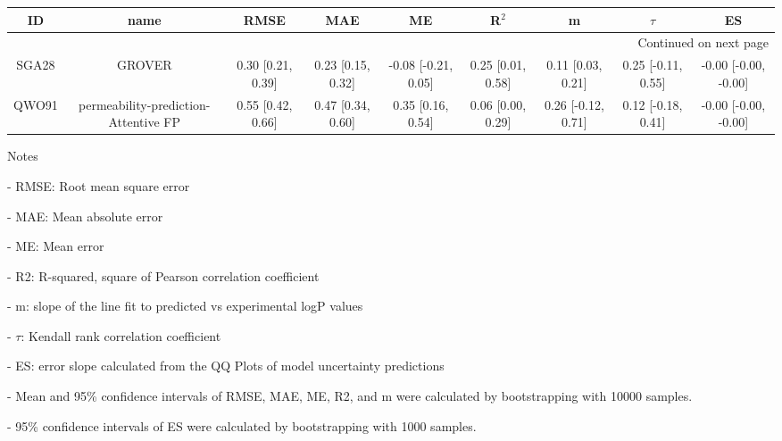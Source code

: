 \documentclass{article}
\begin{document}
\begin{center}
\scriptsize
\begin{longtable}{|ccccccccc|}
\toprule
    ID &                                  name &               RMSE &                MAE &                   ME &              R$^2$ &                   m &              $\tau$ &                    ES \\
\midrule
\endhead
\midrule
\multicolumn{9}{r}{{Continued on next page}} \\
\midrule
\endfoot

\bottomrule
\endlastfoot
 SGA28 &                                GROVER &  0.30 [0.21, 0.39] &  0.23 [0.15, 0.32] &  -0.08 [-0.21, 0.05] &  0.25 [0.01, 0.58] &   0.11 [0.03, 0.21] &  0.25 [-0.11, 0.55] &  -0.00 [-0.00, -0.00] \\
 QWO91 &  permeability-prediction-Attentive FP &  0.55 [0.42, 0.66] &  0.47 [0.34, 0.60] &    0.35 [0.16, 0.54] &  0.06 [0.00, 0.29] &  0.26 [-0.12, 0.71] &  0.12 [-0.18, 0.41] &  -0.00 [-0.00, -0.00] \\
\end{longtable}
\end{center}

Notes

- RMSE: Root mean square error

- MAE: Mean absolute error

- ME: Mean error

- R2: R-squared, square of Pearson correlation coefficient

- m: slope of the line fit to predicted vs experimental logP values

- $\tau$:  Kendall rank correlation coefficient

- ES: error slope calculated from the QQ Plots of model uncertainty predictions

- Mean and 95\% confidence intervals of RMSE, MAE, ME, R2, and m were calculated by bootstrapping with 10000 samples.

- 95\% confidence intervals of ES were calculated by bootstrapping with 1000 samples.\end{document}
\end{document}
